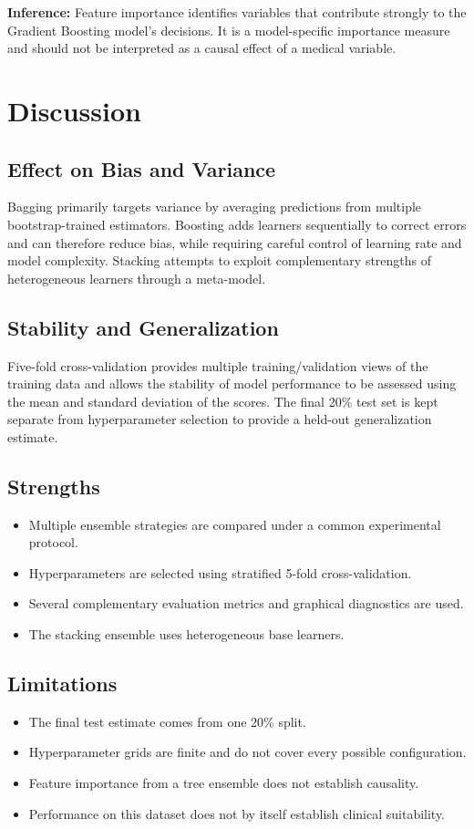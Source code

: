 \documentclass[12pt,a4paper]{article}
\begin{document}
\textbf{Inference:} Feature importance identifies variables that contribute strongly to the Gradient Boosting model's decisions. It is a model-specific importance measure and should not be interpreted as a causal effect of a medical variable.

\section{Discussion}

\subsection{Effect on Bias and Variance}
Bagging primarily targets variance by averaging predictions from multiple bootstrap-trained estimators. Boosting adds learners sequentially to correct errors and can therefore reduce bias, while requiring careful control of learning rate and model complexity. Stacking attempts to exploit complementary strengths of heterogeneous learners through a meta-model.

\subsection{Stability and Generalization}
Five-fold cross-validation provides multiple training/validation views of the training data and allows the stability of model performance to be assessed using the mean and standard deviation of the scores. The final 20\% test set is kept separate from hyperparameter selection to provide a held-out generalization estimate.

\subsection{Strengths}
\begin{itemize}
\item Multiple ensemble strategies are compared under a common experimental protocol.
\item Hyperparameters are selected using stratified 5-fold cross-validation.
\item Several complementary evaluation metrics and graphical diagnostics are used.
\item The stacking ensemble uses heterogeneous base learners.
\end{itemize}

\subsection{Limitations}
\begin{itemize}
\item The final test estimate comes from one 20\% split.
\item Hyperparameter grids are finite and do not cover every possible configuration.
\item Feature importance from a tree ensemble does not establish causality.
\item Performance on this dataset does not by itself establish clinical suitability.
\end{itemize}
\end{document}
